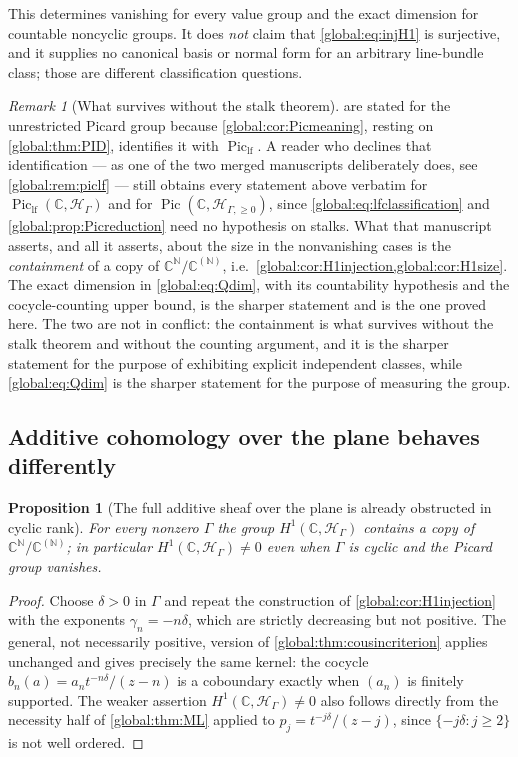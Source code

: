 \documentclass[11pt,letterpaper]{article}
\newtheorem{proposition}[proposition]{Proposition}
\theoremstyle{definition}
\theoremstyle{remark}
\newtheorem{remark}[remark]{Remark}
\newcommand{\C}{\mathbb C}
\newcommand{\N}{\mathbb N}
\newcommand{\HH}{\mathscr H_\Gamma}
\newcommand{\HI}{\mathscr H_{\Gamma,\ge0}}
\newcommand{\Pic}{\operatorname{Pic}}
\newcommand{\Piclf}{\operatorname{Pic}_{\mathrm{lf}}}
\numberwithin{equation}{section}
\begin{document}
This determines vanishing for every value group and the exact dimension for countable noncyclic groups. It does \emph{not} claim that \eqref{global:eq:injH1} is surjective, and it supplies no canonical basis or normal form for an arbitrary line-bundle class; those are different classification questions.

\begin{remark}[What survives without the stalk theorem]\label{global:rem:dimension}
 are stated for the unrestricted Picard group because \cref{global:cor:Picmeaning}, resting on \cref{global:thm:PID}, identifies it with $\Piclf$. A reader who declines that identification --- as one of the two merged manuscripts deliberately does, see \cref{global:rem:piclf} --- still obtains every statement above verbatim for $\Piclf(\C,\HH)$ and for $\Pic(\C,\HI)$, since \eqref{global:eq:lfclassification} and \cref{global:prop:Picreduction} need no hypothesis on stalks. What that manuscript asserts, and all it asserts, about the size in the nonvanishing cases is the \emph{containment} of a copy of $\C^\N/\C^{(\N)}$, i.e.\ \cref{global:cor:H1injection,global:cor:H1size}. The exact dimension in \eqref{global:eq:Qdim}, with its countability hypothesis and the cocycle-counting upper bound, is the sharper statement and is the one proved here. The two are not in conflict: the containment is what survives without the stalk theorem and without the counting argument, and it is the sharper statement for the purpose of exhibiting explicit independent classes, while \eqref{global:eq:Qdim} is the sharper statement for the purpose of measuring the group.
\end{remark}

\subsection{Additive cohomology over the plane behaves differently}

\begin{proposition}[The full additive sheaf over the plane is already obstructed in cyclic rank]\label{global:prop:fullH1}
For every nonzero $\Gamma$ the group $H^1(\C,\HH)$ contains a copy of $\C^\N/\C^{(\N)}$; in particular $H^1(\C,\HH)\ne0$ even when $\Gamma$ is cyclic and the Picard group vanishes.
\end{proposition}

\begin{proof}
Choose $\delta>0$ in $\Gamma$ and repeat the construction of \cref{global:cor:H1injection} with the exponents $\gamma_n=-n\delta$, which are strictly decreasing but not positive. The general, not necessarily positive, version of \cref{global:thm:cousincriterion} applies unchanged and gives precisely the same kernel: the cocycle $b_n(a)=a_nt^{-n\delta}/(z-n)$ is a coboundary exactly when $(a_n)$ is finitely supported. The weaker assertion $H^1(\C,\HH)\ne0$ also follows directly from the necessity half of \cref{global:thm:ML} applied to $p_j=t^{-j\delta}/(z-j)$, since $\{-j\delta:j\ge2\}$ is not well ordered.
\end{proof}
\end{document}
